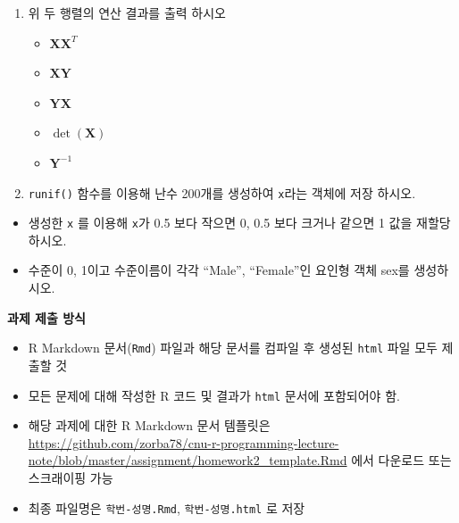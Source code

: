 \documentclass[
  11pt,
]{krantz}
\makeatletter
\providecommand{\tightlist}{%
  \setlength{\itemsep}{0pt}\setlength{\parskip}{0pt}}
\newenvironment{kframe}{%
\medskip{}
\setlength{\fboxsep}{.8em}
 \def\at@end@of@kframe{}%
 \ifinner\ifhmode%
  \def\at@end@of@kframe{\end{minipage}}%
  \begin{minipage}{\columnwidth}%
 \fi\fi%
 \def\FrameCommand##1{\hskip\@totalleftmargin \hskip-\fboxsep
 \colorbox{shadecolor}{##1}\hskip-\fboxsep
     \hskip-\linewidth \hskip-\@totalleftmargin \hskip\columnwidth}%
 \MakeFramed {\advance\hsize-\width
   \@totalleftmargin\z@ \linewidth\hsize
   \@setminipage}}%
 {\par\unskip\endMakeFramed%
 \at@end@of@kframe}
\newenvironment{rmdblock}[1]
  {
  \begin{itemize}
  \renewcommand{\labelitemi}{
    \raisebox{-.7\height}[0pt][0pt]{
      {\setkeys{Gin}{width=3em,keepaspectratio}\texttt{[image: images/\#1]}}
    }
  }
  \setlength{\fboxsep}{1em}
  \begin{kframe}
  \item
  }
  {
  \end{kframe}
  \end{itemize}
  }
\newenvironment{rmdimportant}
  {\begin{rmdblock}{important}}
  {\end{rmdblock}}
\makeatother
\begin{document}
\begin{enumerate}
\def\labelenumi{\arabic{enumi}.}
\setcounter{enumi}{8}
\item
  위 두 행렬의 연산 결과를 출력 하시오

  \begin{itemize}
  \tightlist
  \item
    \(\mathrm{\mathbf{X}}\mathrm{\mathbf{X}}^T\)
  \item
    \(\mathrm{\mathbf{X}}\mathrm{\mathbf{Y}}\)
  \item
    \(\mathrm{\mathbf{Y}}\mathrm{\mathbf{X}}\)
  \item
    \(\det(\mathrm{\mathbf{X}})\)
  \item
    \(\mathrm{\mathbf{Y}}^{-1}\)
  \end{itemize}
\item
  \texttt{runif()} 함수를 이용해 난수 200개를 생성하여 \texttt{x}라는 객체에 저장 하시오.
\end{enumerate}

\begin{itemize}
\tightlist
\item
  생성한 \texttt{x} 를 이용해 \texttt{x}가 0.5 보다 작으면 0, 0.5 보다 크거나 같으면 1 값을 재할당 하시오.
\item
  수준이 0, 1이고 수준이름이 각각 ``Male'', ``Female''인 요인형 객체 sex를 생성하시오.
\end{itemize}

\footnotesize

\begin{rmdimportant}
\begin{rmdimportant}

\textbf{과제 제출 방식}

\begin{itemize}
\tightlist
\item
  R Markdown 문서(\texttt{Rmd}) 파일과 해당 문서를 컴파일 후 생성된 \texttt{html} 파일 모두 제출할 것
\item
  모든 문제에 대해 작성한 R 코드 및 결과가 \texttt{html} 문서에 포함되어야 함.
\item
  해당 과제에 대한 R Markdown 문서 템플릿은 \url{https://github.com/zorba78/cnu-r-programming-lecture-note/blob/master/assignment/homework2_template.Rmd} 에서 다운로드 또는 스크래이핑 가능
\item
  최종 파일명은 \texttt{학번-성명.Rmd}, \texttt{학번-성명.html} 로 저장
\end{itemize}

\end{rmdimportant}
\end{rmdimportant}
\end{document}

